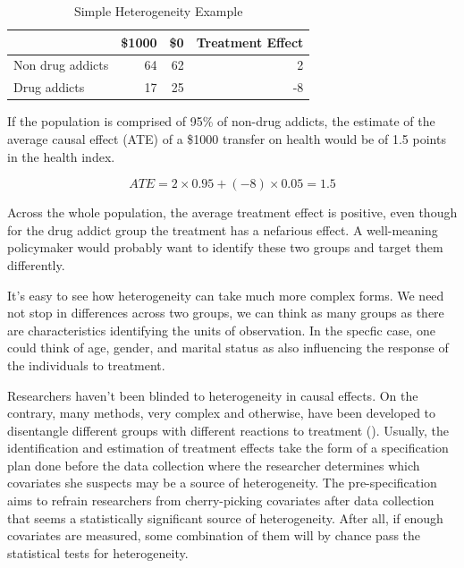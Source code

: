\begin{table}[h!]
  \begin{center}
    \caption{Simple Heterogeneity Example}
    \label{tab:heterogeneity}
    \begin{tabular}{l|r|r|r}
         & \textbf{\$1000} & \textbf{\$0} & \textbf{Treatment Effect}\\
      \hline
        Non drug addicts & 64 & 62 & 2\\
        Drug addicts     & 17 & 25 & -8\\
    \end{tabular}
  \end{center}
\end{table}

If the population is comprised of 95\% of non-drug addicts, the estimate of the average causal effect (ATE) of a \$1000 transfer on health would be of 1.5 points in the health index.

\begin{equation}
    ATE = 2 \times 0.95 + (-8) \times 0.05 = 1.5
\end{equation}

Across the whole population, the average treatment effect is positive, even though for the drug addict group the treatment has a nefarious effect. A well-meaning policymaker would probably want to identify these two groups and target them differently.


It's easy to see how heterogeneity can take much more complex forms. We need not stop in differences across two groups, we can think as many groups as there are characteristics identifying the units of observation. In the specfic case, one could think of age, gender, and marital status as also influencing the response of the individuals to treatment.

Researchers haven't been blinded to heterogeneity in causal effects. On the contrary, many methods, very complex and otherwise, have been developed to disentangle different groups with different reactions to treatment (\cite{imbensIdentificationEstimationLocal1994}). Usually, the identification and estimation of treatment effects take the form of a specification plan done before the data collection where the researcher determines which covariates she suspects may be a source of heterogeneity. The pre-specification aims to refrain researchers from cherry-picking covariates after data collection that seems a statistically significant source of heterogeneity. After all, if enough covariates are measured, some combination of them will by chance pass the statistical tests for heterogeneity.

